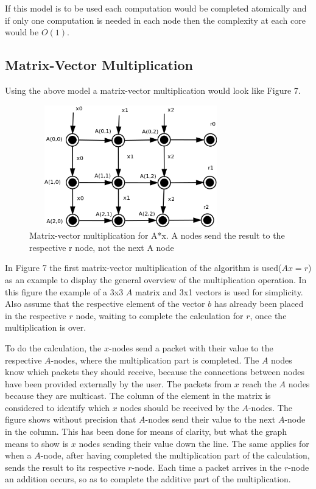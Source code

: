 \documentclass[12pt,twosided]{article}
\begin{document}
If this model is to be used each computation would be completed atomically and if only one computation is needed in each node then the complexity at each core would be $O(1)$.
\subsection{Matrix-Vector Multiplication}
Using the above model a matrix-vector multiplication would look like Figure 7. 
\begin{figure}[h!]
\includegraphics[width=250pt,height=150pt,scale=2]{Pics/mat0mult.png}
\centering
\caption{Matrix-vector multiplication for A*x. A nodes send the result to the respective r node, not the next A node\cite{basicinterim}}
\end{figure}

In Figure 7 the first matrix-vector multiplication of the algorithm is used($Ax=r$) as an example to display the general overview of the multiplication operation. In this figure the example of a 3x3 $A$ matrix and 3x1 vectors is used for simplicity. Also assume that the respective element of the vector $b$ has already been placed in the respective $r$ node, waiting to complete the calculation for $r$, once the multiplication is over. 

To do the calculation, the $x$-nodes send a packet with their value to the respective $A$-nodes, where the multiplication part is completed. The $A$ nodes know which packets they should receive, because the connections between nodes have been provided externally by the user. The packets from $x$ reach the $A$ nodes because they are multicast. The column of the element in the matrix is considered to identify which $x$ nodes should be received by the $A$-nodes. The figure shows without precision that $A$-nodes send their value to the next $A$-node in the column. This has been done for means of clarity, but what the graph means to show is $x$ nodes sending their value down the line. The same applies for when a $A$-node, after having completed the multiplication part of the calculation, sends the result to its respective $r$-node. Each time a packet arrives in the $r$-node an addition occurs, so as to complete the additive part of the multiplication. 
\end{document}
